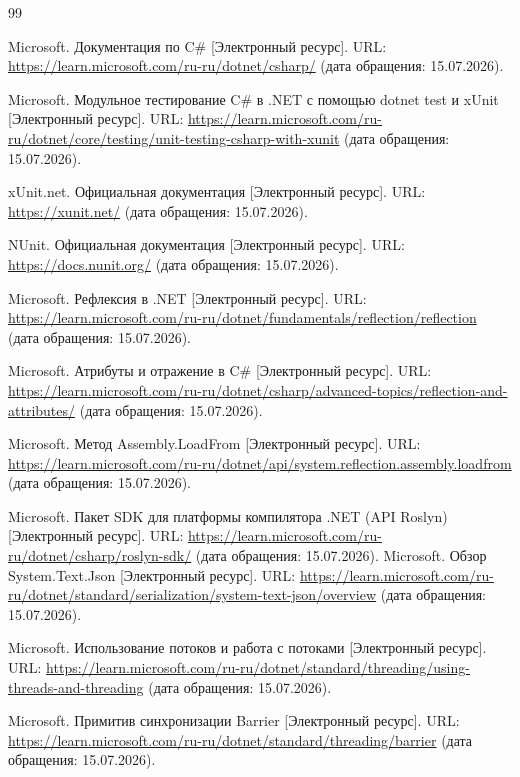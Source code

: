 \documentclass[14pt,a4paper]{extarticle}
\begin{document}
\clearpage
\begin{thebibliography}{99}

    Microsoft. Документация по C\# [Электронный ресурс]. URL: \url{https://learn.microsoft.com/ru-ru/dotnet/csharp/} (дата обращения: 15.07.2026).

    Microsoft. Модульное тестирование C\# в .NET с помощью dotnet test и xUnit [Электронный ресурс]. URL: \url{https://learn.microsoft.com/ru-ru/dotnet/core/testing/unit-testing-csharp-with-xunit} (дата обращения: 15.07.2026).

    xUnit.net. Официальная документация [Электронный ресурс]. URL: \url{https://xunit.net/} (дата обращения: 15.07.2026).

    NUnit. Официальная документация [Электронный ресурс]. URL: \url{https://docs.nunit.org/} (дата обращения: 15.07.2026).

    Microsoft. Рефлексия в .NET [Электронный ресурс]. URL: \url{https://learn.microsoft.com/ru-ru/dotnet/fundamentals/reflection/reflection} (дата обращения: 15.07.2026).

    Microsoft. Атрибуты и отражение в C\# [Электронный ресурс]. URL: \url{https://learn.microsoft.com/ru-ru/dotnet/csharp/advanced-topics/reflection-and-attributes/} (дата обращения: 15.07.2026).

    Microsoft. Метод Assembly.LoadFrom [Электронный ресурс]. URL: \url{https://learn.microsoft.com/ru-ru/dotnet/api/system.reflection.assembly.loadfrom} (дата обращения: 15.07.2026).

    Microsoft. Пакет SDK для платформы компилятора .NET (API Roslyn) [Электронный ресурс]. URL: \url{https://learn.microsoft.com/ru-ru/dotnet/csharp/roslyn-sdk/} (дата обращения: 15.07.2026).
    Microsoft. Обзор System.Text.Json [Электронный ресурс]. URL: \url{https://learn.microsoft.com/ru-ru/dotnet/standard/serialization/system-text-json/overview} (дата обращения: 15.07.2026).

    Microsoft. Использование потоков и работа с потоками [Электронный ресурс]. URL: \url{https://learn.microsoft.com/ru-ru/dotnet/standard/threading/using-threads-and-threading} (дата обращения: 15.07.2026).

    Microsoft. Примитив синхронизации Barrier [Электронный ресурс]. URL: \url{https://learn.microsoft.com/ru-ru/dotnet/standard/threading/barrier} (дата обращения: 15.07.2026).


\end{thebibliography}
\end{document}
